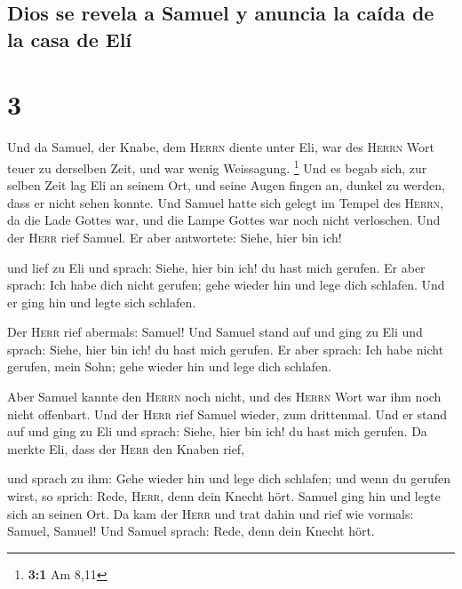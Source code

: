\hypertarget{dios-se-revela-a-samuel-y-anuncia-la-cauxedda-de-la-casa-de-eluxed}{%
\subsection{Dios se revela a Samuel y anuncia la caída de la casa de
Elí}\label{dios-se-revela-a-samuel-y-anuncia-la-cauxedda-de-la-casa-de-eluxed}}

\hypertarget{section-2}{%
\section{3}\label{section-2}}

 Und da Samuel, der Knabe, dem \textsc{Herrn} diente unter
Eli, war des \textsc{Herrn} Wort teuer zu derselben Zeit, und war wenig
Weissagung. \footnote{\textbf{3:1} Am 8,11}  Und es begab
sich, zur selben Zeit lag Eli an seinem Ort, und seine Augen fingen an,
dunkel zu werden, dass er nicht sehen konnte.  Und Samuel
hatte sich gelegt im Tempel des \textsc{Herrn}, da die Lade Gottes war,
und die Lampe Gottes war noch nicht verloschen.  Und der
\textsc{Herr} rief Samuel. Er aber antwortete: Siehe, hier bin ich!

 und lief zu Eli und sprach: Siehe, hier bin ich! du hast
mich gerufen. Er aber sprach: Ich habe dich nicht gerufen; gehe wieder
hin und lege dich schlafen. Und er ging hin und legte sich schlafen.

 Der \textsc{Herr} rief abermals: Samuel! Und Samuel stand
auf und ging zu Eli und sprach: Siehe, hier bin ich! du hast mich
gerufen. Er aber sprach: Ich habe nicht gerufen, mein Sohn; gehe wieder
hin und lege dich schlafen.

 Aber Samuel kannte den \textsc{Herrn} noch nicht, und des
\textsc{Herrn} Wort war ihm noch nicht offenbart.  Und der
\textsc{Herr} rief Samuel wieder, zum drittenmal. Und er stand auf und
ging zu Eli und sprach: Siehe, hier bin ich! du hast mich gerufen. Da
merkte Eli, dass der \textsc{Herr} den Knaben rief,

 und sprach zu ihm: Gehe wieder hin und lege dich
schlafen; und wenn du gerufen wirst, so sprich: Rede, \textsc{Herr},
denn dein Knecht hört. Samuel ging hin und legte sich an seinen Ort.
 Da kam der \textsc{Herr} und trat dahin und rief wie
vormals: Samuel, Samuel! Und Samuel sprach: Rede, denn dein Knecht hört.


